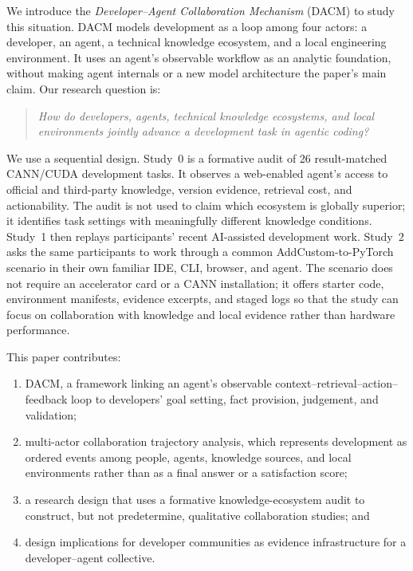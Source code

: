 \documentclass[manuscript,review,anonymous]{acmart}
\begin{document}
We introduce the \emph{Developer--Agent Collaboration Mechanism} (DACM) to study this situation. DACM models development as a loop among four actors: a developer, an agent, a technical knowledge ecosystem, and a local engineering environment. It uses an agent's observable workflow as an analytic foundation, without making agent internals or a new model architecture the paper's main claim. Our research question is:

\begin{quote}
\emph{How do developers, agents, technical knowledge ecosystems, and local environments jointly advance a development task in agentic coding?}
\end{quote}

We use a sequential design. Study~0 is a formative audit of 26 result-matched CANN/CUDA development tasks. It observes a web-enabled agent's access to official and third-party knowledge, version evidence, retrieval cost, and actionability. The audit is not used to claim which ecosystem is globally superior; it identifies task settings with meaningfully different knowledge conditions. Study~1 then replays participants' recent AI-assisted development work. Study~2 asks the same participants to work through a common AddCustom-to-PyTorch scenario in their own familiar IDE, CLI, browser, and agent. The scenario does not require an accelerator card or a CANN installation; it offers starter code, environment manifests, evidence excerpts, and staged logs so that the study can focus on collaboration with knowledge and local evidence rather than hardware performance.

This paper contributes:
\begin{enumerate}[leftmargin=*]
  \item DACM, a framework linking an agent's observable context--retrieval--action--feedback loop to developers' goal setting, fact provision, judgement, and validation;
  \item multi-actor collaboration trajectory analysis, which represents development as ordered events among people, agents, knowledge sources, and local environments rather than as a final answer or a satisfaction score;
  \item a research design that uses a formative knowledge-ecosystem audit to construct, but not predetermine, qualitative collaboration studies; and
  \item design implications for developer communities as evidence infrastructure for a developer--agent collective.
\end{enumerate}
\end{document}
